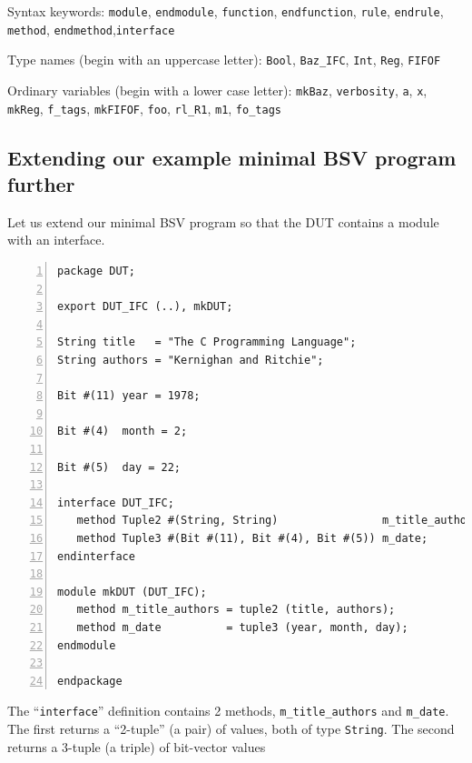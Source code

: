 \begin{tightlist}

 \item Syntax keywords: \verb|module|, \verb|endmodule|,
       \verb|function|, \verb|endfunction|, \verb|rule|,
       \verb|endrule|, \verb|method|,
       \verb|endmethod|,\verb|interface|

 \item Type names (begin with an uppercase letter): \verb|Bool|,
       \verb|Baz_IFC|, \verb|Int|, \verb|Reg|, \verb|FIFOF|

 \item Ordinary variables (begin with a lower case letter): \verb|mkBaz|,
       \verb|verbosity|, \verb|a|, \verb|x|, \verb|mkReg|, \verb|f_tags|,
       \verb|mkFIFOF|,
       \verb|foo|,
       \verb|rl_R1|,
       \verb|m1|,
       \verb|fo_tags|

\end{tightlist}


\subsection{Extending our example minimal BSV program further}

Let us extend our minimal BSV program so that the DUT contains a
module with an interface.

{\small
\begin{Verbatim}[frame=single, numbers=left, label=in file Ex\_04\_04/DUT.bsv]
package DUT;

export DUT_IFC (..), mkDUT;

String title   = "The C Programming Language";
String authors = "Kernighan and Ritchie";

Bit #(11) year = 1978;

Bit #(4)  month = 2;

Bit #(5)  day = 22;

interface DUT_IFC;
   method Tuple2 #(String, String)                m_title_authors;
   method Tuple3 #(Bit #(11), Bit #(4), Bit #(5)) m_date;
endinterface

module mkDUT (DUT_IFC);
   method m_title_authors = tuple2 (title, authors);
   method m_date          = tuple3 (year, month, day);
endmodule

endpackage
\end{Verbatim}
}

The ``\verb|interface|'' definition contains 2 methods,
\verb|m_title_authors| and \verb|m_date|.  The first returns a
``2-tuple'' (a pair) of values, both of type \verb|String|.  The
second returns a 3-tuple (a triple) of bit-vector values

